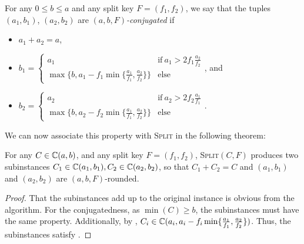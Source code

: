 \documentclass[a4paper,style=print,bibliography=totoc,nexus,lnum,extramargin]{tubsbook}
\begin{document}
\begin{definition}\label{def:rounded}
    For any $0 \le b \le a$ and any split key $F = (f_1, f_2)$, we say that the tuples $(a_1, b_1)$, $(a_2, b_2)$ are \emph{$(a,b,F)$-conjugated} if

    \begin{itemize}
        \item $a_1 + a_2 = a$,
        \item $b_1 = \begin{cases}
                a_1 & \text{if}\ a_1 > 2 f_1 \frac{a_2}{f_2}\\
                \max\{b,a_1 - f_1 \min\{\frac{a_1}{f_1}, \frac{a_2}{f_2}\}\} & \text{else}
            \end{cases}$, and
        \item $b_2 = \begin{cases}
                a_2 & \text{if}\ a_2 > 2 f_2 \frac{a_1}{f_1}\\
                \max\{b,a_2 - f_2 \min\{\frac{a_1}{f_1}, \frac{a_2}{f_2}\}\} & \text{else}
            \end{cases}$.
    \end{itemize}
\end{definition}

We can now associate this property with \textsc{Split} in the following theorem:

\begin{theorem}\label{th:split-sets}
    For any $C \in \mathbb{C}(a,b)$, and any split key $F = (f_1, f_2)$, \textsc{Split}$(C,F)$ produces two subinstances $C_1 \in \mathbb{C}(a_1, b_1), C_2 \in \mathbb{C}(a_2, b_2)$, so that $C_1 + C_2 = C$ and $(a_1, b_1)$ and $(a_2, b_2)$ are $(a,b,F)$-rounded.
\end{theorem}

\begin{proof}
    That the subinstances add up to the original instance is obvious from the algorithm.
    For the conjugatedness, as $\min(C) \ge b$, the subinstances must have the same property. Additionally, by , $C_i \in \mathbb{C}(a_i, a_i - f_i \min\{\frac{a_1}{f_1}, \frac{a_2}{f_2}\})$. Thus, the subinstances satisfy .
\end{proof}

\end{document}
